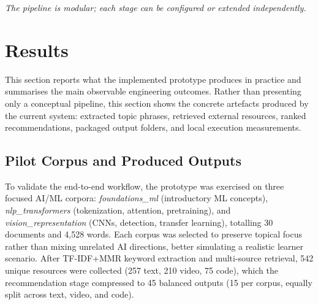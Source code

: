 \documentclass[10pt,journal,compsoc]{IEEEtran}
\begin{document}
%

\noindent \textit{The pipeline is modular; each stage can be configured or extended independently.}

\section{Results}
This section reports what the implemented prototype produces in practice and summarises the main observable engineering outcomes. Rather than presenting only a conceptual pipeline, this section shows the concrete artefacts produced by the current system: extracted topic phrases, retrieved external resources, ranked recommendations, packaged output folders, and local execution measurements.

\subsection{Pilot Corpus and Produced Outputs}

To validate the end-to-end workflow, the prototype was exercised on three focused AI/ML corpora: \emph{foundations\_ml} (introductory ML concepts), \emph{nlp\_transformers} (tokenization, attention, pretraining), and \emph{vision\_representation} (CNNs, detection, transfer learning), totalling 30 documents and 4,528 words. Each corpus was selected to preserve topical focus rather than mixing unrelated AI directions, better simulating a realistic learner scenario. After TF-IDF+MMR keyword extraction and multi-source retrieval, 542 unique resources were collected (257 text, 210 video, 75 code), which the recommendation stage compressed to 45 balanced outputs (15 per corpus, equally split across text, video, and code).
\end{document}
